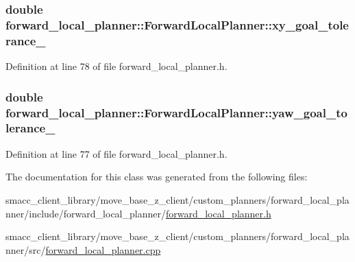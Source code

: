 \subsubsection[{\texorpdfstring{xy\+\_\+goal\+\_\+tolerance\+\_\+}{xy_goal_tolerance_}}]{\setlength{\rightskip}{0pt plus 5cm}double forward\+\_\+local\+\_\+planner\+::\+Forward\+Local\+Planner\+::xy\+\_\+goal\+\_\+tolerance\+\_\+\hspace{0.3cm}{\ttfamily [private]}}\hypertarget{classforward__local__planner_1_1ForwardLocalPlanner_a7b8d0133662354613ee30db8571fc380}{}\label{classforward__local__planner_1_1ForwardLocalPlanner_a7b8d0133662354613ee30db8571fc380}


Definition at line 78 of file forward\+\_\+local\+\_\+planner.\+h.

\subsubsection[{\texorpdfstring{yaw\+\_\+goal\+\_\+tolerance\+\_\+}{yaw_goal_tolerance_}}]{\setlength{\rightskip}{0pt plus 5cm}double forward\+\_\+local\+\_\+planner\+::\+Forward\+Local\+Planner\+::yaw\+\_\+goal\+\_\+tolerance\+\_\+\hspace{0.3cm}{\ttfamily [private]}}\hypertarget{classforward__local__planner_1_1ForwardLocalPlanner_a078a55bb035682cf8e484ecf9519004d}{}\label{classforward__local__planner_1_1ForwardLocalPlanner_a078a55bb035682cf8e484ecf9519004d}


Definition at line 77 of file forward\+\_\+local\+\_\+planner.\+h.



The documentation for this class was generated from the following files\+:\begin{DoxyCompactItemize}
\item 
smacc\+\_\+client\+\_\+library/move\+\_\+base\+\_\+z\+\_\+client/custom\+\_\+planners/forward\+\_\+local\+\_\+planner/include/forward\+\_\+local\+\_\+planner/\hyperlink{forward__local__planner_8h}{forward\+\_\+local\+\_\+planner.\+h}\item 
smacc\+\_\+client\+\_\+library/move\+\_\+base\+\_\+z\+\_\+client/custom\+\_\+planners/forward\+\_\+local\+\_\+planner/src/\hyperlink{forward__local__planner_8cpp}{forward\+\_\+local\+\_\+planner.\+cpp}\end{DoxyCompactItemize}
